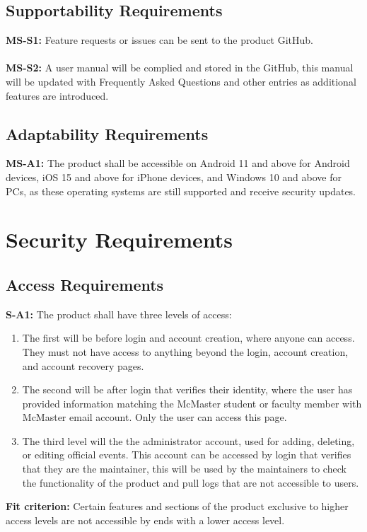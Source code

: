 \documentclass[12pt]{article}
\begin{document}
\subsection{Supportability Requirements}
  \textbf{MS-S1:} Feature requests or issues can be sent to the product GitHub.\\\\
  \textbf{MS-S2:} A user manual will be complied and stored in the GitHub, this manual will be updated with Frequently Asked Questions and other entries as additional features are introduced.\\
\subsection{Adaptability Requirements}
  \textbf{MS-A1:} The product shall be accessible on Android 11 and above for Android devices, iOS 15 and above for iPhone devices, and Windows 10 and above for PCs, as these operating systems are still supported and receive security updates.\\

\section{Security Requirements}
\subsection{Access Requirements}
  \textbf{S-A1:} The product shall have three levels of access:
  \begin{enumerate}  
    \item The first will be before login and account creation, where anyone can access. They must not have access to anything beyond the login, account creation, and account recovery pages.
    \item The second will be after login that verifies their identity, where the user has provided information matching the McMaster student or faculty member with McMaster email account. Only the user can access this page.
    \item The third level will the the administrator account, used for adding, deleting, or editing official events. This account can be accessed by login that verifies that they are the maintainer, this will be used by the maintainers to check the functionality of the product  and pull logs that are not accessible to users.
  \end{enumerate}
  \textbf{Fit criterion:} Certain features and sections of the product exclusive to higher access levels are not accessible by ends with a lower access level.\\
\end{document}
